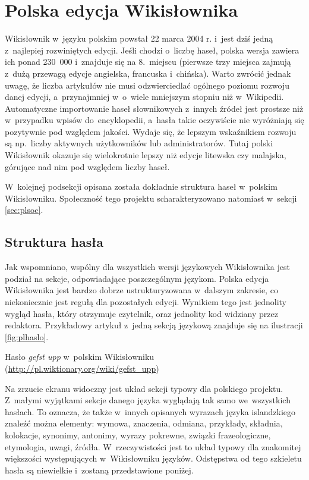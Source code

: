 \documentclass{pracamgr}
\begin{document}
\section{Polska edycja Wikisłownika}
\label{sec:plwikt}
Wikisłownik w~języku polskim powstał 22 marca 2004 r. %
i~jest dziś jedną z~najlepiej rozwiniętych edycji. Jeśli chodzi o~liczbę haseł, polska wersja zawiera ich ponad 230~000 i~znajduje się na 8.~miejscu (pierwsze trzy miejsca zajmują z~dużą przewagą edycje angielska, francuska i~chińska). Warto zwrócić jednak uwagę, że liczba artykułów nie musi odzwierciedlać ogólnego poziomu rozwoju danej edycji, a~przynajmniej w~o~wiele mniejszym stopniu niż w~Wikipedii. Automatyczne importowanie haseł słownikowych z~innych źródeł jest prostsze niż w~przypadku wpisów do~encyklopedii, a~hasła takie oczywiście nie wyróżniają się pozytywnie pod względem jakości. Wydaje się, że lepszym wskaźnikiem rozwoju są np.\ liczby aktywnych użytkowników lub administratorów. Tutaj polski Wikisłownik okazuje się wielokrotnie lepszy niż edycje litewska czy malajska, górujące nad nim pod względem liczby haseł.

W~kolejnej podsekcji opisana została dokładnie struktura haseł w~polskim Wikisłowniku. Społeczność tego projektu scharakteryzowano natomiast w~sekcji \ref{sec:plsoc}.

\subsection{Struktura hasła}
Jak wspomniano, wspólny dla wszystkich wersji językowych Wikisłownika jest podział na sekcje, odpowiadające poszczególnym językom. Polska edycja Wikisłownika jest bardzo dobrze ustrukturyzowana w~dalszym zakresie, co niekoniecznie jest regułą dla pozostałych edycji. Wynikiem tego jest jednolity wygląd hasła, który otrzymuje czytelnik, oraz jednolity kod widziany przez redaktora. Przykładowy artykuł z~jedną sekcją językową znajduje się na ilustracji \ref{fig:plhaslo}.

\begin{illustration}
	\caption{Hasło \emph{gefst upp} w~polskim Wikisłowniku (\protect\url{http://pl.wiktionary.org/wiki/gefst_upp})}
	\label{fig:plhaslo}
\end{illustration}

Na zrzucie ekranu widoczny jest układ sekcji typowy dla polskiego projektu. Z~małymi wyjątkami sekcje danego języka wyglądają tak samo we~wszystkich hasłach. To oznacza, że także w~innych opisanych wyrazach języka islandzkiego znaleźć można elementy: wymowa, znaczenia, odmiana, przykłady, składnia, kolokacje, synonimy, antonimy, wyrazy pokrewne, związki frazeologiczne, etymologia, uwagi, źródła. W~rzeczywistości jest to układ typowy dla znakomitej większości występujących w~Wikisłowniku języków. Odstępstwa od tego szkieletu hasła są niewielkie i~zostaną przedstawione poniżej.
\end{document}
